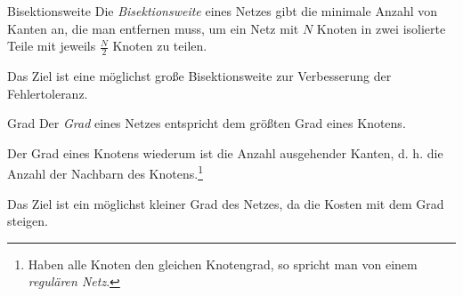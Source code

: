 \begin{defi}{Bisektionsweite}
    Die \emph{Bisektionsweite} eines Netzes gibt die minimale Anzahl von Kanten an, die man entfernen muss, um ein Netz mit $N$ Knoten in zwei isolierte Teile mit jeweils $\frac{N}{2}$ Knoten zu teilen.

    Das Ziel ist eine möglichst große Bisektionsweite zur Verbesserung der Fehlertoleranz.
\end{defi}

\begin{defi}{Grad}
    Der \emph{Grad} eines Netzes entspricht dem größten Grad eines Knotens.

    Der Grad eines Knotens wiederum ist die Anzahl ausgehender Kanten, d. h. die Anzahl der Nachbarn des Knotens.\footnote{Haben alle Knoten den gleichen Knotengrad, so spricht man von einem \emph{regulären Netz}.}

    Das Ziel ist ein möglichst kleiner Grad des Netzes, da die Kosten mit dem Grad steigen.
\end{defi}

